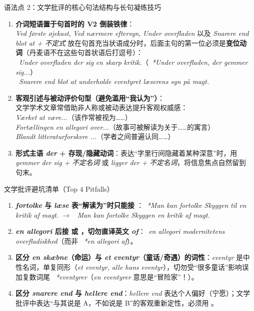 \begin{grammatikbox}{语法点 2：文学批评的核心句法结构与长句凝练技巧}
\begin{enumerate}
  \item \textbf{介词短语置于句首时的 V2 倒装铁律}：\\
    \textit{Ved første øjekast}, \textit{Ved nærmere eftersyn}, \textit{Under overfladen} 以及 \textit{Snarere end blot at + 不定式} 放在句首充当状语成分时，后面主句的第一位必须是\textbf{变位动词}（丹麦语不在这些句首状语后打逗号）：\\
    \ \textit{Under overfladen  der sig en skarp kritik.}（\ \textit{*Under overfladen, der gemmer sig...}）\\
    \ \textit{Snarere end blot at underholde  eventyret læserens syn på magt.}
  \item \textbf{客观引述与被动评价句型（避免滥用“我认为”）}：\\
    文学学术文章常借助非人称或被动表达提升客观权威感：\\
     \textit{Værket  at være...}（该作常被视为……）\\
     \textit{Fortællingen  en allegori over...}（故事可被解读为关于……的寓言）\\
     \textit{Blandt litteraturforskere ...}（学者之间普遍认同……）
  \item \textbf{形式主语 \textit{der} + 存现/隐藏动词}：表达“字里行间隐藏着某种深意”时，用 \textit{gemmer der sig + 不定名词} 或 \textit{ligger der + 不定名词}，将信息焦点自然留到句末。
\end{enumerate}
\end{grammatikbox}

\begin{grammatikbox}{文学批评避坑清单（Top 4 Pitfalls）}
\begin{enumerate}
  \item \textbf{ \textit{fortolke} 与 \textit{læse} 表“解读为”时只能接 }：\ \textit{*Man kan fortolke Skyggen til en kritik af magt.} $\rightarrow$ \ \textit{Man kan fortolke Skyggen  en kritik af magt.}
  \item \textbf{ \textit{en allegori} 后接  或 ，切勿直译英文 \textit{of}}：\ \textit{en allegori  modernitetens overfladiskhed}（而非 \ \textit{*en allegori af}）。
  \item \textbf{ 区分 \textit{en skæbne}（命运）与 \textit{et eventyr}（童话/奇遇）的词性}：\textit{eventyr} 是中性名词，单复同形（\textit{et eventyr, alle hans eventyr}），切勿受“很多童话”影响误加复数词尾 \ \textit{*eventyrer}（\textit{en eventyrer} 意思是“冒险家”！）。
  \item \textbf{ 区分 \textit{snarere end} 与 \textit{hellere end}}：\textit{hellere end} 表达个人偏好（宁愿）；文学批评中表达“与其说是 A，不如说是 B”的客观重新定性，必须用 。
\end{enumerate}
\end{grammatikbox}

